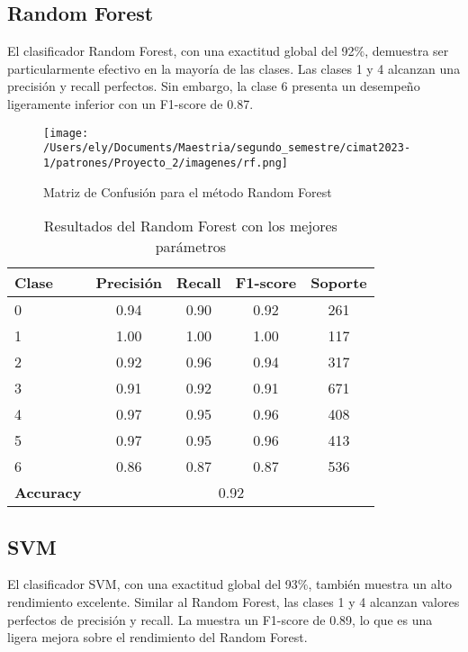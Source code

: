 \documentclass[letterpaper,spanish,reprint,nofootinbib,showkeys,aps]{revtex4-2}
\begin{document}
\subsection*{Random Forest}


El clasificador Random Forest, con una exactitud global del 92$\%$, demuestra ser particularmente efectivo en la mayoría de las clases. Las clases 1  y 4 alcanzan una precisión y recall perfectos. Sin embargo, la clase 6 presenta un desempeño ligeramente inferior con un F1-score de 0.87.


\begin{figure} [H]
	\begin{center}
		\texttt{[image: /Users/ely/Documents/Maestria/segundo\_semestre/cimat2023-1/patrones/Proyecto\_2/imagenes/rf.png]}
		\caption{Matriz de Confusión para el método Random Forest }
		\label{RF} 
   \end{center} 
\end{figure}


\begin{table}[ht]
	\centering
	\begin{tabular}{lcccc}
	\hline
	\textbf{Clase} & \textbf{Precisión} & \textbf{Recall} & \textbf{F1-score} & \textbf{Soporte} \\
	\hline
	0 & 0.94 & 0.90 & 0.92 & 261 \\
	1 & 1.00 & 1.00 & 1.00 & 117 \\
	2 & 0.92 & 0.96 & 0.94 & 317 \\
	3 & 0.91 & 0.92 & 0.91 & 671 \\
	4 & 0.97 & 0.95 & 0.96 & 408 \\
	5 & 0.97 & 0.95 & 0.96 & 413 \\
	6 & 0.86 & 0.87 & 0.87 & 536 \\
	\hline
	\textbf{Accuracy} & \multicolumn{4}{c}{0.92} \\
	\hline
	\end{tabular}
	\caption{Resultados del Random Forest con los mejores parámetros}
	\label{tab:random_forest_results}
	\end{table}


\subsection*{SVM}

El clasificador SVM, con una exactitud global del 93$\%$, también muestra un alto rendimiento excelente. Similar al Random Forest, las clases 1  y 4 alcanzan valores perfectos de precisión y recall. La  muestra un F1-score de 0.89, lo que es una ligera mejora sobre el rendimiento del Random Forest.
\end{document}
